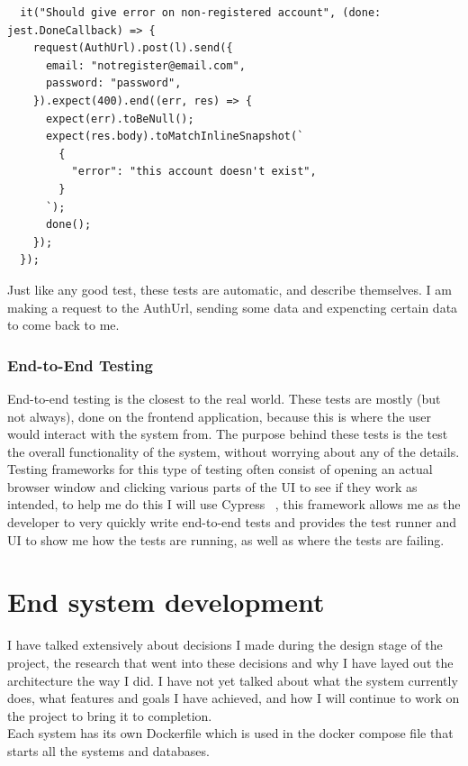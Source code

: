 \documentclass[titlepage]{article}
\begin{document}
\begin{verbatim}
  it("Should give error on non-registered account", (done: jest.DoneCallback) => {
    request(AuthUrl).post(l).send({
      email: "notregister@email.com",
      password: "password",
    }).expect(400).end((err, res) => {
      expect(err).toBeNull();
      expect(res.body).toMatchInlineSnapshot(`
        {
          "error": "this account doesn't exist",
        }
      `);
      done();
    });
  });
\end{verbatim}

Just like any good test, these tests are automatic, and describe themselves. I am making a request to the AuthUrl, sending some data and expencting certain data to come back to me. \\

\subsubsection{End-to-End Testing}
End-to-end testing is the closest to the real world. These tests are mostly (but not always), done on the frontend application, because this is where the user would interact with the system from. The purpose behind these tests is the test the overall functionality of the system, without worrying about any of the details. \\

Testing frameworks for this type of testing often consist of opening an actual browser window and clicking various parts of the UI to see if they work as intended, to help me do this I will use Cypress ~\cite{cypress}, this framework allows me as the developer to very quickly write end-to-end tests and provides the test runner and UI to show me how the tests are running, as well as where the tests are failing. 

\section{End system development}
I have talked extensively about decisions I made during the design stage of the project, the research that went into these decisions and why I have layed out the architecture the way I did. I have not yet talked about what the system currently does, what features and goals I have achieved, and how I will continue to work on the project to bring it to completion. \\

Each system has its own Dockerfile which is used in the docker compose file that starts all the systems and databases.
\end{document}
